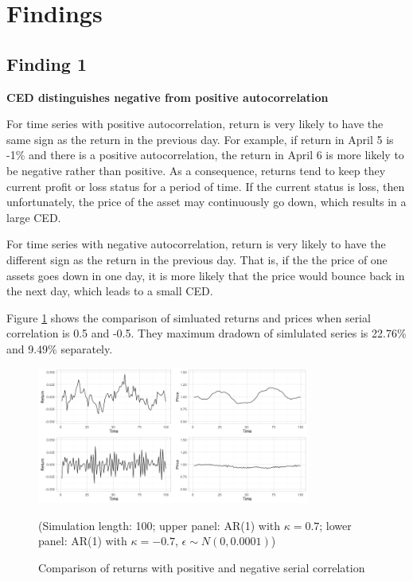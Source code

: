 \documentclass[11pt]{article}
\begin{document}
\section{Findings}  %

\subsection{Finding 1}

\textbf{CED distinguishes negative from positive autocorrelation}

For time series with positive autocorrelation, return is very likely to have the same sign as the return in the previous day. For example, if return in April 5 is -1\% and there is a positive autocorrelation, the return in April 6 is more likely to be negative rather than positive. As a consequence, returns tend to keep they current profit or loss status for a period of time. If the current status is loss, then unfortunately, the price of the asset may continuously go down, which results in a large CED.

For time series with negative autocorrelation, return is very likely to have the different sign as the return in the previous day. That is, if the the price of one assets goes down in one day, it is more likely that the price would bounce back in the next day, which leads to a small CED. 

Figure \ref{fig:Comparison_pos_neg_autocorrelation} shows the comparison of simluated returns and prices when serial correlation is 0.5 and -0.5. They maximum dradown of simlulated series is 22.76\% and 9.49\% separately. 

\begin{figure}[H]
\centering
\includegraphics[width = 0.8\textwidth]{../figures/simulation/Comparison_pos_neg_autocorrelation}
\caption{Comparison of returns with positive and negative serial correlation}
(Simulation length: 100; upper panel: AR(1) with $\kappa=0.7$; lower panel: AR(1) with $\kappa=-0.7$, $\epsilon\sim N(0, 0.0001)$)
\label{fig:Comparison_pos_neg_autocorrelation}
\end{figure}
\end{document}
